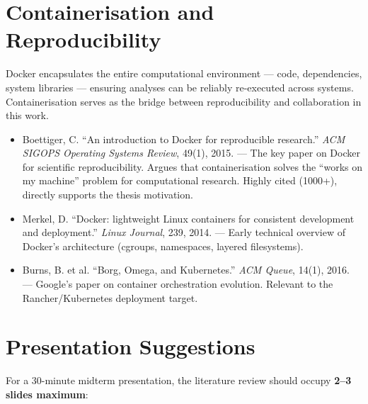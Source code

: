 \documentclass[12pt,a4paper]{article}
\begin{document}
\section{Containerisation and Reproducibility}

Docker \cite{docker_docs} encapsulates the entire computational environment --- code, dependencies, system libraries --- ensuring analyses can be reliably re-executed across systems. Containerisation serves as the bridge between reproducibility and collaboration in this work.

\begin{addedsource}
\begin{itemize}[nosep]
  \item Boettiger, C. ``An introduction to Docker for reproducible research.'' \textit{ACM SIGOPS Operating Systems Review}, 49(1), 2015. --- The key paper on Docker for scientific reproducibility. Argues that containerisation solves the ``works on my machine'' problem for computational research. Highly cited (1000+), directly supports the thesis motivation.
  \item Merkel, D. ``Docker: lightweight Linux containers for consistent development and deployment.'' \textit{Linux Journal}, 239, 2014. --- Early technical overview of Docker's architecture (cgroups, namespaces, layered filesystems).
  \item Burns, B. et al. ``Borg, Omega, and Kubernetes.'' \textit{ACM Queue}, 14(1), 2016. --- Google's paper on container orchestration evolution. Relevant to the Rancher/Kubernetes deployment target.
\end{itemize}
\end{addedsource}

\section{Presentation Suggestions}

For a 30-minute midterm presentation, the literature review should occupy \textbf{2--3 slides maximum}:
\end{document}
